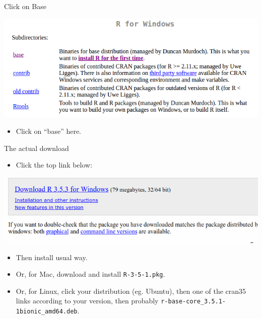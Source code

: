 \documentclass[ignorenonframetext,]{beamer}
\providecommand{\tightlist}{%
  \setlength{\itemsep}{0pt}\setlength{\parskip}{0pt}}
\begin{document}
\begin{frame}{Click on Base}
\protect\hypertarget{click-on-base}{}

\includegraphics{r33.png}

\begin{itemize}
\tightlist
\item
  Click on ``base'' here.
\end{itemize}

\end{frame}

\begin{frame}[fragile]{The actual download}
\protect\hypertarget{the-actual-download}{}

\begin{itemize}
\tightlist
\item
  Click the top link below:
\end{itemize}

\includegraphics{dlr35.png}

\begin{itemize}
\tightlist
\item
  Then install usual way.
\item
  Or, for Mac, download and install \texttt{R-3-5-1.pkg}.
\item
  Or, for Linux, click your distribution (eg. Ubuntu), then one of the
  cran35 links according to your version, then probably
  \texttt{r-base-core\_3.5.1-1bionic\_amd64.deb}.
\end{itemize}

\end{frame}
\end{document}

